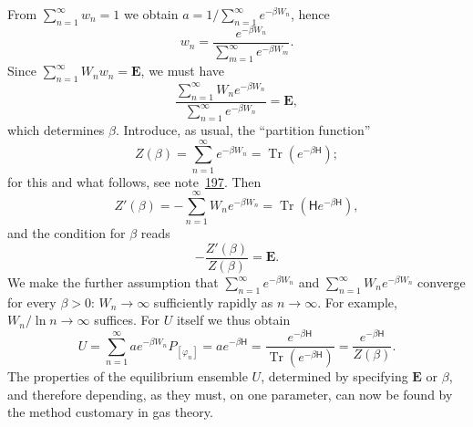 \documentclass[fontsize=13pt,twoside,openany,headings=normal,parskip=false,bookmarkpackage=false,DIV=calc]{scrbook}
\begin{document}
\hypertarget{origpage-209}{}%
From $\sum_{n=1}^{\infty}w_n=1$ we obtain $a=1/\sum_{n=1}^{\infty}e^{-\beta W_n}$, hence
\[
w_n=\frac{e^{-\beta W_n}}{\sum_{m=1}^{\infty}e^{-\beta W_m}}.
\]
Since $\sum_{n=1}^{\infty}W_nw_n=\mathbf E$, we must have
\[
\frac{\sum_{n=1}^{\infty}W_ne^{-\beta W_n}}{\sum_{n=1}^{\infty}e^{-\beta W_n}}=\mathbf E,
\]
which determines $\beta$. Introduce, as usual, the ``partition function''
\[
Z(\beta)=\sum_{n=1}^{\infty}e^{-\beta W_n}=\operatorname{Tr}(e^{-\beta \mathsf{H}});
\]
for this and what follows, see note~\hyperlink{note-197}{197}. Then
\[
Z'(\beta)=-\sum_{n=1}^{\infty}W_ne^{-\beta W_n}=\operatorname{Tr}(\mathsf{H}e^{-\beta \mathsf{H}}),
\]
and the condition for $\beta$ reads
\[
-\frac{Z'(\beta)}{Z(\beta)}=\mathbf E.
\]
We make the further assumption that $\sum_{n=1}^{\infty}e^{-\beta W_n}$ and $\sum_{n=1}^{\infty}W_ne^{-\beta W_n}$ converge for every $\beta>0$: $W_n\to\infty$ sufficiently rapidly as $n\to\infty$. For example, $W_n/\ln n\to\infty$ suffices. For $U$ itself we thus obtain
\[
U=\sum_{n=1}^{\infty}ae^{-\beta W_n}P_{[\varphi_n]}
=ae^{-\beta \mathsf{H}}=\frac{e^{-\beta \mathsf{H}}}{\operatorname{Tr}(e^{-\beta \mathsf{H}})}
=\frac{e^{-\beta \mathsf{H}}}{Z(\beta)}.
\]
The properties of the equilibrium ensemble $U$, determined by specifying $\mathbf E$ or $\beta$, and therefore depending, as they must, on one parameter, can now be found by the method customary in gas theory.
\end{document}
